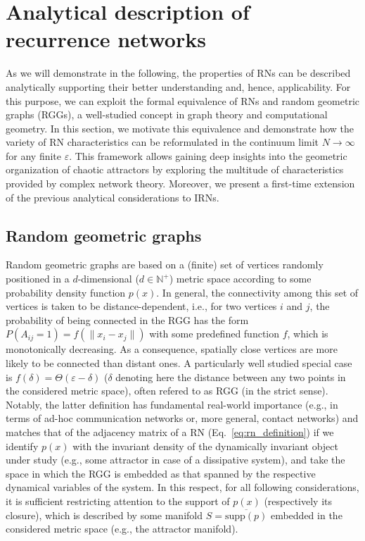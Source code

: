 \documentclass[graybox]{svmult}
\begin{document}


\section{Analytical description of recurrence networks}\label{sec:analytics}

As we will demonstrate in the following, the properties of RNs can be described analytically supporting their better understanding and, hence, applicability. For this purpose, we can exploit the formal equivalence of RNs and random geometric graphs (RGGs), a well-studied concept in graph theory and computational geometry. In this section, we motivate this equivalence and demonstrate how the variety of RN characteristics can be reformulated in the continuum limit $N\to\infty$ for any finite $\varepsilon$. This framework allows gaining deep insights into the geometric organization of chaotic attractors by exploring the multitude of characteristics provided by complex network theory. Moreover, we present a first-time extension~\cite{Donges2012PhD} of the previous analytical considerations \cite{Donges2012PRE} to IRNs.


\subsection{Random geometric graphs}

Random geometric graphs \cite{Penrose2003} are based on a (finite) set of vertices randomly positioned in a $d$-dimensional ($d\in\mathbb{N}^+$) metric space according to some probability density function $p(x)$. In general, the connectivity among this set of vertices is taken to be distance-dependent, i.e., for two vertices $i$ and $j$, the probability of being connected in the RGG has the form $P(A_{ij}=1)=f(\|x_i-x_j\|)$ with some predefined function $f$, which is monotonically decreasing. As a consequence, spatially close vertices are more likely to be connected than distant ones. A particularly well studied special case is $f(\delta)=\Theta(\varepsilon-\delta)$ ($\delta$ denoting here the distance between any two points in the considered metric space), often refered to as RGG (in the strict sense). Notably, the latter definition has fundamental real-world importance (e.g., in terms of ad-hoc communication networks or, more general, contact networks) and matches that of the adjacency matrix of a RN (Eq.~\ref{eq:rn_definition}) if we identify $p(x)$ with the invariant density of the dynamically invariant object under study (e.g., some attractor in case of a dissipative system), and take the space in which the RGG is embedded as that spanned by the respective dynamical variables of the system. In this respect, for all following considerations, it is sufficient restricting attention to the support of $p(x)$ (respectively its closure), which is described by some manifold $S=\overline{\mbox{supp}(p)}$ embedded in the considered metric space (e.g., the attractor manifold).
\end{document}
